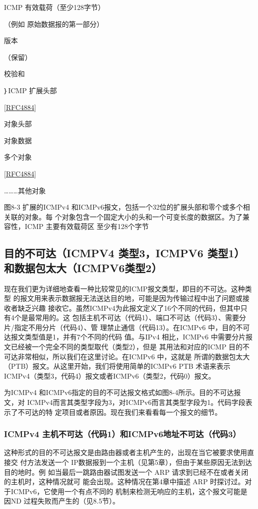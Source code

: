 ICMP 有效载荷（至少128字节）

（例如 原始数据报的第一部分）

版本

（保留）

校验和

｝ICMP 扩展头部

\href{https://www.rfc-editor.org/rfc/rfc4884}{[RFC4884]}

对象头部

对象数据

多个对象

\href{https://www.rfc-editor.org/rfc/rfc4884}{[RFC4884]}

………其他对象

图8-3 扩展的ICMPv4 和ICMPv6报文，包括一个32位的扩展头部和零个或多个相关联的对象。每
个对象包含一个固定大小的头和一个可变长度的数据区。为了兼容性，ICMP 主要有效载荷区
至少有128个字节

\subsection{目的不可达（ICMPV4 类型3，ICMPV6 类型1）和数据包太大（ICMPV6类型2）}

现在我们更为详细地查看一种比较常见的ICMP报文类型，即目的不可达。这种类型
的报文用来表示数据报无法送达目的地，可能是因为传输过程中出了问题或接收者缺乏兴趣
接收它。虽然ICMPv4为此报文定义了16个不同的代码，但其中只有4个是最常用的。这
包括主机不可达（代码1）、端口不可达（代码3）、需要分片/指定不用分片（代码4）、管
理禁止通信（代码13）。在ICMPv6 中，目的不可达报文类型值是1，并有7个不同的代码
值。与IPv4 相比，ICMPv6 中需要分片报文已经被一个完全不同的类型取代（类型2），但是
其用法和对应的ICMP 目的不可达非常相似，所以我们在这里讨论。在ICMPv6 中，这就是
所谓的数据包太大（PTB）报文。从这里开始，我们将使用简单的ICMPv6 PTB 术语来表示
ICMPv4（类型3，代码4）报文或者ICMPv6（类型2，代码0）报文。

为ICMPv4 和ICMPv6指定的目的不可达报文格式如图8-4所示。目的不可达报文，对
ICMPv4而言其类型字段为3，对ICMPv6而言其类型字段为1。代码字段表示了不可达的特
定项目或者原因。现在我们来看看每一个报文的细节。

\subsubsection{ICMPv4 主机不可达（代码1）和ICMPv6地址不可达（代码3）}
这种形式的目的不可达报文是由路由器或者主机产生的，出现在当它被要求使用直接交
付方法发送一个 IP数据报到一个主机（见第5章），但由于某些原因无法到达目的地时。例
如当最后一跳路由器试图发送一个 ARP 请求到已经不在或者关闭的主机时，这种情况就可
能会出现。这种情况在第4章中描述 ARP 时探讨过。对于ICMPv6，它使用一个有点不同的
机制来检测无响应的主机，这个报文可能是因ND 过程失败而产生的（见8.5节）。

